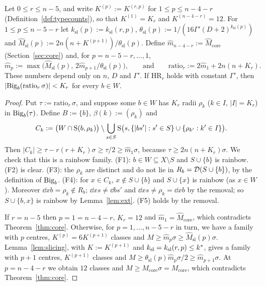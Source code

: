 \begin{theorem}[E1$_r$]\label{thm:E1}
Let $0\le r\le n-5$, and write $K^{(p)}:=K^{(r,p)}$ for $1\le p\le n-4-r$ (Definition~\ref{def:typecounts}), so that
$K^{(1)}=K_r$ and $K^{(n-4-r)}=12$. For $1\le p\le n-5-r$ let $k_{\mathrm{sl}}(p):=k_{\mathrm{sl}}(r,p)$,
$\theta_{\mathrm{sl}}(p):=1/(16\Gamma'(D+2)^{k_{\mathrm{sl}}(p)})$ and $\hat M_{\mathrm{sl}}(p):=2n(n+K^{(p+1)})/\theta_{\mathrm{sl}}(p)$. Define
$\hat m_{n-4-r}:=\hat M_{\mathrm{core}}$ (Section~\ref{sec:core}) and, for $p=n-5-r,\dots,1$,
\[
\hat m_p:=\max\bigl(\hat M_{\mathrm{sl}}(p),\,2\hat m_{p+1}/\theta_{\mathrm{sl}}(p)\bigr),\qquad\text{and}\qquad
{\mathrm{ratio}}_r:=2\hat m_1+2n(n+K_r).
\]
These numbers depend only on $n$, $D$ and $\Gamma'$. If HR$_r$ holds with constant $\Gamma'$, then
$|\mathrm{Big}_b({\mathrm{ratio}}_r\,\sigma)|<K_r$ for every $b\in W$.
\end{theorem}

\begin{proof}
Put $\tau:={\mathrm{ratio}}_r\,\sigma$, and suppose some $b\in W$ has $K_r$ radii $\rho_k$ ($k\in I$, $|I|=K_r$) in $\mathrm{Big}_b(\tau)$.
Define $B:=\{b\}$, $\beta(k):=(\rho_k)$ and
\[
C_k:=\bigl(W\cap\mathrm{S}(b,\rho_k)\bigr)\setminus\bigcup_{s\in S}\mathrm{S}\bigl(s,\{|bs'|:s'\in S\}\cup\{\rho_{k'}:k'\in I\}\bigr).
\]
Then $|C_k|\ge\tau-r(r+K_r)\sigma\ge\tau/2\ge\hat m_1\sigma$, because $\tau\ge2n(n+K_r)\sigma$. We check that this is a rainbow family.
(F1): $b\in W\subseteq X\setminus S$ and $S\cup\{b\}$ is rainbow. (F2) is clear. (F3): the $\rho_k$ are distinct and do not lie in
$R_b=\mathcal{D}(S\cup\{b\})$, by the definition of $\mathrm{Big}_b$. (F4): for $x\in C_k$, $x\notin S\cup\{b\}$ and $S\cup\{x\}$ is rainbow (as
$x\in W$). Moreover $\dd xb=\rho_k\notin R_b$; $\dd xs\ne\dd b{s'}$ and $\dd xs\ne\rho_k=\dd xb$ by the removal; so
$S\cup\{b,x\}$ is rainbow by Lemma~\ref{lem:ext}. (F5) holds by the removal.

If $r=n-5$ then $p=1=n-4-r$, $K_r=12$ and $\hat m_1=\hat M_{\mathrm{core}}$, which contradicts Theorem~\ref{thm:core}. Otherwise, for
$p=1,\dots,n-5-r$ in turn, we have a family with $p$ centres, $K^{(p)}=6K^{(p+1)}$ classes and $M\ge\hat m_p\sigma\ge\hat M_{\mathrm{sl}}(p)\sigma$.
Lemma~\ref{lem:slicing}, with $K:=K^{(p+1)}$ and $k_{\mathrm{sl}}=k_{\mathrm{sl}}(r,p)\le k^{\ast}$, gives a family with $p+1$ centres,
$K^{(p+1)}$ classes and $M\ge\theta_{\mathrm{sl}}(p)\hat m_p\sigma/2\ge\hat m_{p+1}\sigma$. At $p=n-4-r$ we obtain $12$ classes and
$M\ge\hat M_{\mathrm{core}}\sigma=M_{\mathrm{core}}$, which contradicts Theorem~\ref{thm:core}.
\end{proof}

